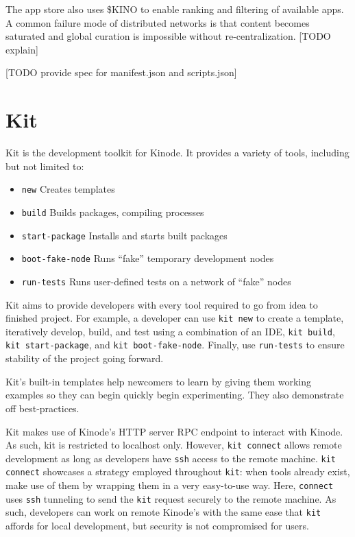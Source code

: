 \documentclass[runningheads]{llncs}
\begin{document}
The app store also uses \$KINO to enable ranking and filtering of available apps.
A common failure mode of distributed networks is that content becomes saturated and global curation is impossible without re-centralization. [TODO explain]

[TODO provide spec for manifest.json and scripts.json]

%
%
%
\section{Kit}

Kit is the development toolkit for Kinode.
It provides a variety of tools, including but not limited to:
\begin{itemize}
\item \verb|new| Creates templates
\item \verb|build| Builds packages, compiling processes
\item \verb|start-package| Installs and starts built packages
\item \verb|boot-fake-node| Runs ``fake'' temporary development nodes
\item \verb|run-tests| Runs user-defined tests on a network of ``fake'' nodes
\end{itemize}

Kit aims to provide developers with every tool required to go from idea to finished project.
For example, a developer can use \verb|kit new| to create a template, iteratively develop, build, and test using a combination of an IDE, \verb|kit build|, \verb|kit start-package|, and \verb|kit boot-fake-node|.
Finally, use \verb|run-tests| to ensure stability of the project going forward.

Kit's built-in templates help newcomers to learn by giving them working examples so they can begin quickly begin experimenting.
They also demonstrate off best-practices.

Kit makes use of Kinode's HTTP server RPC endpoint to interact with Kinode.
As such, kit is restricted to localhost only.
However, \verb|kit connect| allows remote development as long as developers have \verb|ssh| access to the remote machine.
\verb|kit connect| showcases a strategy employed throughout \verb|kit|: when tools already exist, make use of them by wrapping them in a very easy-to-use way.
Here, \verb|connect| uses \verb|ssh| tunneling to send the \verb|kit| request securely to the remote machine.
As such, developers can work on remote Kinode's with the same ease that \verb|kit| affords for local development, but security is not compromised for users.
\end{document}
